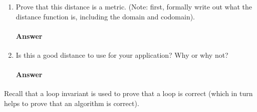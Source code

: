 \documentclass{article}
\begin{document}
\begin{enumerate}

    \item Prove that this distance is a metric. (Note: first, formally write out
        what the distance function is, including the domain and codomain).

        \paragraph{Answer}


    \item Is this a good distance to use for your application?  Why or why not?

        \paragraph{Answer}


\end{enumerate}


\collab{\todo{}} 

Recall that a loop invariant is used to prove that a loop is correct (which in
turn helps to prove that an algorithm is correct).
\end{document}
